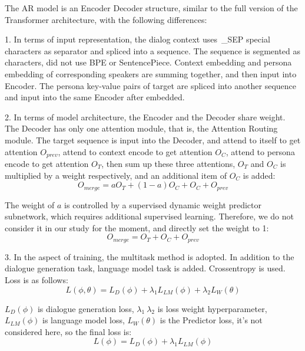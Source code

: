 \documentclass[letterpaper]{article} %
\DeclareRobustCommand{\citeext}[1]{\cite[#1]{#1}}
\begin{document}
The AR model is an Encoder Decoder structure, similar to the full version of the Transformer architecture\citeext{Vaswani2017}, with the following differences: 

1. In terms of input representation, the dialog context uses~\_SEP special characters as separator and spliced into a sequence. The sequence is segmented as characters, did not use BPE or SentencePiece. Context embedding and persona embedding of corresponding speakers are summing together, and then input into Encoder. The persona key-value pairs of target are spliced into another sequence and input into the same Encoder after embedded. 

2. In terms of model architecture, the Encoder and the Decoder share weight. The Decoder has only one attention module, that is, the Attention Routing module. The target sequence is input into the Decoder, and attend to itself to get attention $O_{prev}$, attend to context encode to get attention $O_C$, attend to persona encode to get attention $O_T$, then sum up these three attentions, $O_T$ and $O_C$ is multiplied by a weight respectively, and an additional item of $O_C$ is added: 
\begin{equation}
O_{merge} = aO_T + (1 - a)O_C + O_C + O_{prev}    
\end{equation}

The weight of $a$ is controlled by a supervised dynamic weight predictor subnetwork, which requires additional supervised learning. Therefore, we do not consider it in our study for the moment, and directly set the weight to 1: 
\begin{equation}
O_{merge} = O_T + O_C + O_{prev}    
\end{equation}

3. In the aspect of training, the multitask method is adopted. In addition to the dialogue generation task, language model task is added. Crossentropy is used. Loss is as follows: 
\begin{equation}
L(\phi, \theta) = L_D(\phi) + \lambda_1L_{LM}(\phi) + \lambda_2L_W(\theta)
\end{equation}

$L_D(\phi)$ is dialogue generation loss, $\lambda_1~\lambda_2$ is loss weight hyperparameter, $L_{LM}(\phi)$ is language model loss, $L_W(\theta)$ is the Predictor loss, it's not considered here, so the final loss is:
\begin{equation}
L(\phi) = L_D(\phi) + \lambda_1L_{LM}(\phi)
\end{equation}
\end{document}
